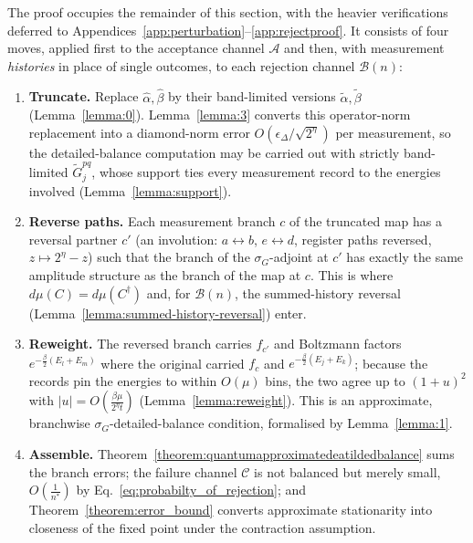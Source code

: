 \documentclass[aps,floatfix,10pt,amssymb,amsfont,amsmath,superscriptaddress,float,nofootinbib,longbibliography,nobalancelastpage,twocolumn]{revtex4-2}
\begin{document}
The proof occupies the remainder of this section, with the heavier verifications deferred to Appendices~\ref{app:perturbation}--\ref{app:rejectproof}. It consists of four moves, applied first to the acceptance channel $\mathcal{A}$ and then, with measurement \emph{histories} in place of single outcomes, to each rejection channel $\mathcal{B}(n)$:
\begin{enumerate}
    \item \textbf{Truncate.} Replace $\hat\alpha, \hat\beta$ by their band-limited versions $\tilde\alpha, \tilde\beta$ (Lemma~\ref{lemma:0}). Lemma~\ref{lemma:3} converts this operator-norm replacement into a diamond-norm error $O(\epsilon_{\Delta}/\sqrt{2^{\eta}})$ per measurement, so the detailed-balance computation may be carried out with strictly band-limited $\tilde G^{pq}_j$, whose support ties every measurement record to the energies involved (Lemma~\ref{lemma:support}).
    \item \textbf{Reverse paths.} Each measurement branch $c$ of the truncated map has a reversal partner $c'$ (an involution: $a \leftrightarrow b$, $e \leftrightarrow d$, register paths reversed, $z \mapsto 2^{\eta}-z$) such that the branch of the $\sigma_G$-adjoint at $c'$ has exactly the same amplitude structure as the branch of the map at $c$. This is where $d\mu(C) = d\mu(C^{\dagger})$ and, for $\mathcal{B}(n)$, the summed-history reversal (Lemma~\ref{lemma:summed-history-reversal}) enter.
    \item \textbf{Reweight.} The reversed branch carries $f_{c'}$ and Boltzmann factors $e^{-\frac{\beta}{2}(E_l+E_m)}$ where the original carried $f_c$ and $e^{-\frac{\beta}{2}(E_j+E_k)}$; because the records pin the energies to within $O(\mu)$ bins, the two agree up to $(1+u)^2$ with $|u| = O(\frac{\beta\mu}{2^{\eta}t})$ (Lemma~\ref{lemma:reweight}). This is an approximate, branchwise $\sigma_G$-detailed-balance condition, formalised by Lemma~\ref{lemma:1}.
    \item \textbf{Assemble.} Theorem~\ref{theorem:quantumapproximatedeatildedbalance} sums the branch errors; the failure channel $\mathcal{C}$ is not balanced but merely small, $O(\frac{1}{n^*})$ by Eq.~\eqref{eq:probabilty_of_rejection}; and Theorem~\ref{theorem:error_bound} converts approximate stationarity into closeness of the fixed point under the contraction assumption.
\end{enumerate}
\end{document}
